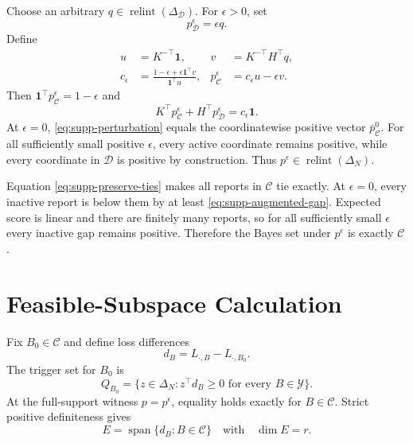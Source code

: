 \documentclass[twoside]{article}
\newcommand{\Y}{\mathcal Y}
\newcommand{\simplex}{\Delta}
\newcommand{\1}{\mathbf 1}
\begin{document}
Choose an arbitrary $q\in\operatorname{relint}(\simplex_{\mathcal D})$. For $\epsilon>0$, set
\begin{equation}
p_{\mathcal D}^\epsilon=\epsilon q.
\end{equation}
Define
\begin{align}
u&=K^{-\top}\1,
&v&=K^{-\top}H^\top q,\\
c_\epsilon&=\frac{1-\epsilon+\epsilon\1^\top v}{\1^\top u},
&p_{\mathcal C}^\epsilon&=c_\epsilon u-\epsilon v.
\label{eq:supp-perturbation}
\end{align}
Then $\1^\top p_{\mathcal C}^\epsilon=1-\epsilon$ and
\begin{equation}
K^\top p_{\mathcal C}^\epsilon+H^\top p_{\mathcal D}^\epsilon
=c_\epsilon\1.
\label{eq:supp-preserve-ties}
\end{equation}
At $\epsilon=0$, \eqref{eq:supp-perturbation} equals the coordinatewise positive vector $\bar p^0_{\mathcal C}$. For all sufficiently small positive $\epsilon$, every active coordinate remains positive, while every coordinate in $\mathcal D$ is positive by construction. Thus $p^\epsilon\in\operatorname{relint}(\simplex_N)$.

Equation \eqref{eq:supp-preserve-ties} makes all reports in $\mathcal C$ tie exactly. At $\epsilon=0$, every inactive report is below them by at least \eqref{eq:supp-augmented-gap}. Expected score is linear and there are finitely many reports, so for all sufficiently small $\epsilon$ every inactive gap remains positive. Therefore the Bayes set under $p^\epsilon$ is exactly $\mathcal C$.

\section{Feasible-Subspace Calculation}

Fix $B_0\in\mathcal C$ and define loss differences
\begin{equation}
d_B=L_{\cdot,B}-L_{\cdot,B_0}.
\end{equation}
The trigger set for $B_0$ is
\begin{equation}
Q_{B_0}=\{z\in\simplex_N:z^\top d_B\geq0\text{ for every }B\in\Y\}.
\label{eq:supp-trigger}
\end{equation}
At the full-support witness $p=p^\epsilon$, equality holds exactly for $B\in\mathcal C$. Strict positive definiteness gives
\begin{equation}
E=\operatorname{span}\{d_B:B\in\mathcal C\}
\quad\text{with}\quad
\dim E=r.
\label{eq:supp-E}
\end{equation}
\end{document}
